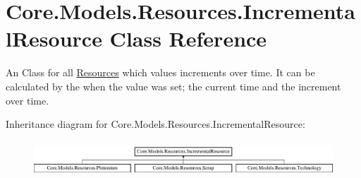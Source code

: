 \hypertarget{classCore_1_1Models_1_1Resources_1_1IncrementalResource}{}\section{Core.\+Models.\+Resources.\+Incremental\+Resource Class Reference}
\label{classCore_1_1Models_1_1Resources_1_1IncrementalResource}


An Class for all \hyperlink{namespaceCore_1_1Models_1_1Resources}{Resources} which values increments over time. It can be calculated by the when the value was set; the current time and the increment over time.  


Inheritance diagram for Core.\+Models.\+Resources.\+Incremental\+Resource\+:\begin{figure}[H]
\begin{center}
\leavevmode
\includegraphics[height=1.333333cm]{classCore_1_1Models_1_1Resources_1_1IncrementalResource}
\end{center}
\end{figure}
